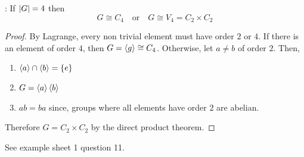 \documentclass{article}
\begin{document}
\begin{lemma}: If $\left\lvert G\right\rvert = 4$ then
    \[
        G \cong C_4 \quad \text{or} \quad G \cong V_4 = C_2 \times C_2  
    \]
\end{lemma}
\begin{proof}
    By Lagrange, every non trivial element must have order $2$ or $4$. 
    If there is an element of order $4$, then $G = \left\langle g\right\rangle \cong C_4$.
    Otherwise, let $a \neq b$ of order $2$. Then,
    \begin{enumerate}
        \item $\left\langle a\right\rangle \cap \left\langle b\right\rangle = \{ e \}$
        \item $G = \left\langle a\right\rangle\left\langle b\right\rangle$
        \item $ab = ba$ since, groups where all elements have order $2$ are abelian.
    \end{enumerate}
    Therefore $G = C_2 \times C_2$ by the direct product theorem.
\end{proof}
\begin{remark}
    See example sheet 1 question 11.
\end{remark}
\end{document}
